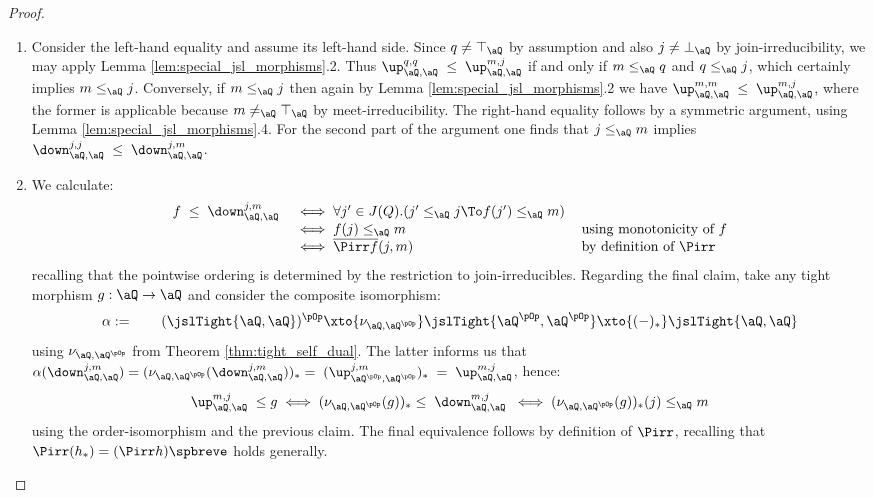 \documentclass{article}
\begin{document}
\begin{proof}
\item
\begin{enumerate}
\item
Consider the left-hand equality and assume its left-hand side. Since $q \neq \top_\aQ$ by assumption and also $j \neq \bot_\aQ$ by join-irreducibility, we may apply Lemma \ref{lem:special_jsl_morphisms}.2. Thus $\up_{\aQ,\aQ}^{q,q} \;\leq\; \up_{\aQ,\aQ}^{m,j}$ if and only if $m \leq_\aQ q$ and $q \leq_\aQ j$, which certainly implies $m \leq_\aQ j$. Conversely, if $m \leq_\aQ j$ then again by Lemma \ref{lem:special_jsl_morphisms}.2 we have $\up_{\aQ,\aQ}^{m,m} \;\leq\; \up_{\aQ,\aQ}^{m,j}$, where the former is applicable because $m \neq_\aQ \top_\aQ$ by meet-irreducibility. The right-hand equality follows by a symmetric argument, using Lemma \ref{lem:special_jsl_morphisms}.4. For the second part of the argument one finds that $j \leq_\aQ m$ implies $\down_{\aQ,\aQ}^{j,j} \;\leq\; \down_{\aQ,\aQ}^{j,m}$.

\item
We calculate:
\[
\begin{tabular}{lll}
$f \; \leq \; \down_{\aQ,\aQ}^{j,m}$
&
$\iff \forall j' \in J(Q).(j' \leq_\aQ j \To f(j') \leq_\aQ m)$
& 
\\&
$\iff f(j) \leq_\aQ m$
& using monotonicity of $f$
\\&
$\iff \overline{\Pirr f}(j,m)$
& by definition of $\Pirr$
\end{tabular}
\]
recalling that the pointwise ordering is determined by the restriction to join-irreducibles. Regarding the final claim, take any tight morphism $g : \aQ \to \aQ$ and consider the composite isomorphism:
\[
\alpha :=
\qquad
(\jslTight{\aQ,\aQ})^{\pOp}
\xto{\nu_{\aQ,\aQ^{\pOp}}}
\jslTight{\aQ^{\pOp},\aQ^{\pOp}}
\xto{(-)_*}
\jslTight{\aQ,\aQ}
\]
using $\nu_{\aQ,\aQ^{\pOp}}$ from Theorem \ref{thm:tight_self_dual}. The latter informs us that $\alpha(\down_{\aQ,\aQ}^{j,m}) = (\nu_{\aQ,\aQ^{\pOp}}(\down_{\aQ,\aQ}^{j,m}))_* =\; (\up_{\aQ^{\pOp},\aQ^{\pOp}}^{j,m})_* \;=\; \up_{\aQ,\aQ}^{m,j}$, hence:
\[
\up_{\aQ,\aQ}^{m,j} \; \leq g
\iff
(\nu_{\aQ,\aQ^{\pOp}}(g))_* \leq \; \down_{\aQ,\aQ}^{m,j} \;
\iff
(\nu_{\aQ,\aQ^{\pOp}}(g))_*(j) \leq_\aQ m
\]
using the order-isomorphism and the previous claim. The final equivalence follows by definition of $\Pirr$, recalling that $\Pirr(h_*) = (\Pirr h)\spbreve$ holds generally.
\end{enumerate}
\end{proof}
\end{document}
